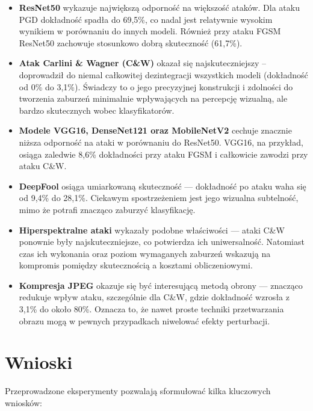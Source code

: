 \documentclass[12pt]{article}
\begin{document}
\begin{itemize}
    \item \textbf{ResNet50} wykazuje największą odporność na większość ataków. Dla ataku PGD dokładność spadła do 69{,}5\%, co nadal jest relatywnie wysokim wynikiem w porównaniu do innych modeli. Również przy ataku FGSM ResNet50 zachowuje stosunkowo dobrą skuteczność (61{,}7\%).
    
    \item \textbf{Atak Carlini \& Wagner (C\&W)} okazał się najskuteczniejszy – doprowadził do niemal całkowitej dezintegracji wszystkich modeli (dokładność od 0\% do 3{,}1\%). Świadczy to o jego precyzyjnej konstrukcji i zdolności do tworzenia zaburzeń minimalnie wpływających na percepcję wizualną, ale bardzo skutecznych wobec klasyfikatorów.
    
    \item \textbf{Modele VGG16, DenseNet121 oraz MobileNetV2} cechuje znacznie niższa odporność na ataki w porównaniu do ResNet50. VGG16, na przykład, osiąga zaledwie 8{,}6\% dokładności przy ataku FGSM i całkowicie zawodzi przy ataku C\&W.
    
    \item \textbf{DeepFool} osiąga umiarkowaną skuteczność — dokładność po ataku waha się od 9{,}4\% do 28{,}1\%. Ciekawym spostrzeżeniem jest jego wizualna subtelność, mimo że potrafi znacząco zaburzyć klasyfikację.
    
    \item \textbf{Hiperspektralne ataki} wykazały podobne właściwości — ataki C\&W ponownie były najskuteczniejsze, co potwierdza ich uniwersalność. Natomiast czas ich wykonania oraz poziom wymaganych zaburzeń wskazują na kompromis pomiędzy skutecznością a kosztami obliczeniowymi.
    
    \item \textbf{Kompresja JPEG} okazuje się być interesującą metodą obrony — znacząco redukuje wpływ ataku, szczególnie dla C\&W, gdzie dokładność wzrosła z 3{,}1\% do około 80\%. Oznacza to, że nawet proste techniki przetwarzania obrazu mogą w pewnych przypadkach niwelować efekty perturbacji.
\end{itemize}

\section{Wnioski}

Przeprowadzone eksperymenty pozwalają sformułować kilka kluczowych wniosków:
\end{document}
